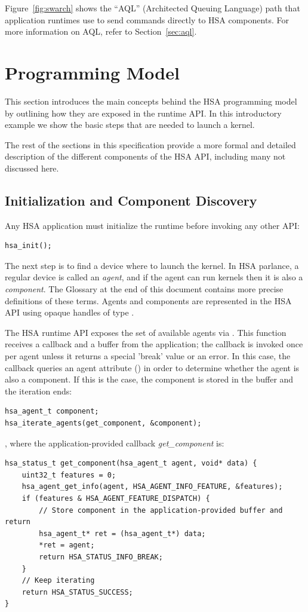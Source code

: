 \documentclass[final,oneside]{book}
\begin{document}
Figure~\ref{fig:swarch} shows the ``AQL'' (Architected Queuing
Language) path that application runtimes use to send commands directly to
HSA components. For more information on AQL, refer to Section~\ref{sec:aql}.


\section{Programming Model}\label{sec:executionmodel}

This section introduces the main concepts behind the HSA programming model by
outlining how they are exposed in the runtime API. In this introductory example
we show the basic steps that are needed to launch a kernel.

The rest of the sections in this specification provide a more formal and
detailed description of the different components of the HSA API, including many
not discussed here.

\subsection{Initialization and Component Discovery}
Any HSA application must initialize the runtime before invoking any other API:
\begin{lstlisting}
hsa_init();
\end{lstlisting}
The next step is to find a device where to launch the kernel. In HSA parlance, a
regular device is called an \emph{agent}, and if the agent can run kernels then
it is also a \emph{component}. The Glossary at the end of this document contains
more precise definitions of these terms. Agents and components are represented
in the HSA API using opaque handles of type .

The HSA runtime API exposes the set of available agents via
. This function receives a callback and a buffer from
the application; the callback is invoked once per agent unless it returns a
special 'break' value or an error. In this case, the callback queries an agent
attribute () in order to determine whether the
agent is also a component. If this is the case, the component is stored in the
buffer and the iteration ends:

\begin{lstlisting}
hsa_agent_t component;
hsa_iterate_agents(get_component, &component);
\end{lstlisting}
, where the application-provided callback \textit{get_component} is:
\begin{lstlisting}
hsa_status_t get_component(hsa_agent_t agent, void* data) {
    uint32_t features = 0;
    hsa_agent_get_info(agent, HSA_AGENT_INFO_FEATURE, &features);
    if (features & HSA_AGENT_FEATURE_DISPATCH) {
        // Store component in the application-provided buffer and return
        hsa_agent_t* ret = (hsa_agent_t*) data;
        *ret = agent;
        return HSA_STATUS_INFO_BREAK;
    }
    // Keep iterating
    return HSA_STATUS_SUCCESS;
}
\end{lstlisting}
\end{document}

